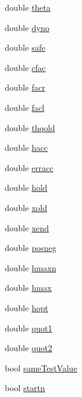 \begin{DoxyCompactItemize}
\item 
double \hyperlink{classodes_1_1Radau5cc_af9475ed436133a308c22edfda6892988}{theta}
\item 
double \hyperlink{classodes_1_1Radau5cc_a36cb3bec1d0c8e1f6ea23eec088d5fa7}{dyno}
\item 
double \hyperlink{classodes_1_1Radau5cc_a8809fb6e400f5eaa32331a2e463f9cdb}{safe}
\item 
double \hyperlink{classodes_1_1Radau5cc_afa383ebf8974ba3aac8841b6a4b43afa}{cfac}
\item 
double \hyperlink{classodes_1_1Radau5cc_a2bda7f90bc9aabbc2d98ff14daeaa491}{facr}
\item 
double \hyperlink{classodes_1_1Radau5cc_a13fe7121c4b03dca25bfb7b362032182}{facl}
\item 
double \hyperlink{classodes_1_1Radau5cc_adda256e4a50fe0b527b9a389ba06a9c4}{thqold}
\item 
double \hyperlink{classodes_1_1Radau5cc_a868b61b5db9d458fd554f004ca366a52}{hacc}
\item 
double \hyperlink{classodes_1_1Radau5cc_a54eb4159056970d5c2c3ea85e79154bb}{erracc}
\item 
double \hyperlink{classodes_1_1Radau5cc_a042b65cfeb0816edd1c2218ea9fe56c9}{hold}
\item 
double \hyperlink{classodes_1_1Radau5cc_a46e492dffaba4f529881e74bda794bbd}{xold}
\item 
double \hyperlink{classodes_1_1Radau5cc_ac6e95e640106e403c36b260fa97d1bb6}{xend}
\item 
double \hyperlink{classodes_1_1Radau5cc_a4acabf9c37c68c6b50dd32c6a12724a6}{posneg}
\item 
double \hyperlink{classodes_1_1Radau5cc_aa3b6b73884b0a085cf7f2b701940658e}{hmaxn}
\item 
double \hyperlink{classodes_1_1Radau5cc_a73d88dc2c07d7e200a1c03dae8caa7f4}{hmax}
\item 
double \hyperlink{classodes_1_1Radau5cc_a9c91cdeb773885e6b7cf3699142c80eb}{hopt}
\item 
double \hyperlink{classodes_1_1Radau5cc_a0c3cc3ba99f9aca257eab5b3a1f4cb43}{quot1}
\item 
double \hyperlink{classodes_1_1Radau5cc_a66d2ae6f5ecac2c7983fe54293a6cc30}{quot2}
\item 
bool \hyperlink{classodes_1_1Radau5cc_acab8ee5b4ea97c71a0f34bf41f145a58}{same\-Test\-Value}
\item 
bool \hyperlink{classodes_1_1Radau5cc_a04284948029a635e8d0d4ea79e15c5ea}{startn}
\item 

\end{DoxyCompactItemize}
